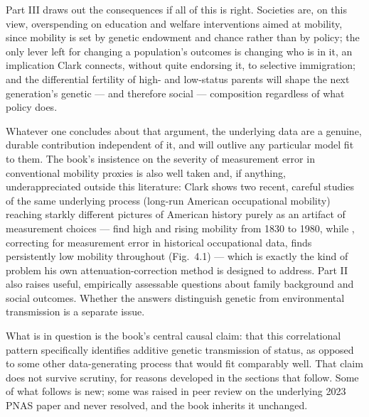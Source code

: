 \documentclass[12pt]{article}
\begin{document}
Part III draws out the consequences if all of this is right. Societies are,
on this view, overspending on education and welfare interventions aimed at
mobility, since mobility is set by genetic endowment and chance rather than
by policy; the only lever left for changing a population's outcomes is
changing who is in it, an implication Clark connects, without quite
endorsing it, to selective immigration; and the differential fertility of
high- and low-status parents will shape the next generation's genetic --- and
therefore social --- composition regardless of what policy does.

Whatever one concludes about that argument, the underlying data are a
genuine, durable contribution independent of it, and will outlive any
particular model fit to them. The book's insistence on the severity of
measurement error in conventional mobility proxies is also well taken and,
if anything, underappreciated outside this literature: Clark shows two
recent, careful studies of the same underlying process (long-run American
occupational mobility) reaching starkly different pictures of American
history purely as an artifact of measurement choices --- \citet{SongEtAl2020}
find high and rising mobility from 1830 to 1980, while \citet{Ward2023},
correcting for measurement error in historical occupational data, finds
persistently low mobility throughout (Fig.~4.1) --- which is exactly the
kind of problem his own attenuation-correction method is designed to
address. Part II also raises useful, empirically assessable questions about family
background and social outcomes. Whether the answers distinguish genetic
from environmental transmission is a separate issue.

What is in question is the book's central causal claim: that this
correlational pattern specifically identifies additive genetic transmission
of status, as opposed to some other data-generating process that would fit
comparably well. That claim does not survive scrutiny, for reasons developed
in the sections that follow. Some of what follows is new; some was raised
in peer review on the underlying 2023 PNAS paper and never resolved, and the
book inherits it unchanged.







\end{document}
